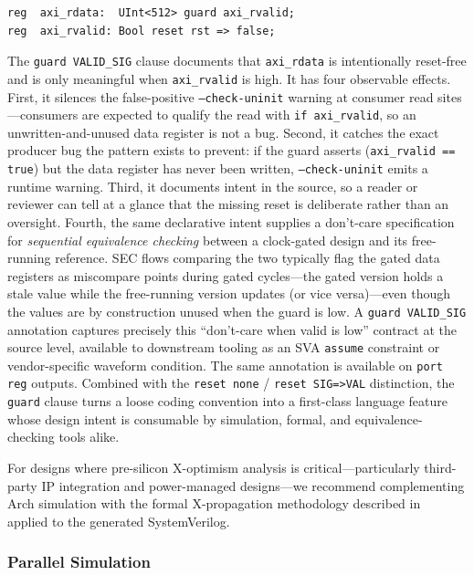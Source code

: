 \documentclass[11pt,twocolumn]{article}
\begin{document}
\begin{lstlisting}[language=Arch]
reg  axi_rdata:  UInt<512> guard axi_rvalid;
reg  axi_rvalid: Bool reset rst => false;
\end{lstlisting}

The \texttt{guard VALID\_SIG} clause documents that \texttt{axi\_rdata} is intentionally reset-free and is only meaningful when \texttt{axi\_rvalid} is high. It has four observable effects. First, it silences the false-positive \texttt{--check-uninit} warning at consumer read sites---consumers are expected to qualify the read with \texttt{if axi\_rvalid}, so an unwritten-and-unused data register is not a bug. Second, it catches the exact producer bug the pattern exists to prevent: if the guard asserts (\texttt{axi\_rvalid == true}) but the data register has never been written, \texttt{--check-uninit} emits a runtime warning. Third, it documents intent in the source, so a reader or reviewer can tell at a glance that the missing reset is deliberate rather than an oversight. Fourth, the same declarative intent supplies a don't-care specification for \emph{sequential equivalence checking} between a clock-gated design and its free-running reference. SEC flows comparing the two typically flag the gated data registers as miscompare points during gated cycles---the gated version holds a stale value while the free-running version updates (or vice versa)---even though the values are by construction unused when the guard is low. A \texttt{guard VALID\_SIG} annotation captures precisely this ``don't-care when valid is low'' contract at the source level, available to downstream tooling as an SVA \texttt{assume} constraint or vendor-specific waveform condition. The same annotation is available on \texttt{port reg} outputs. Combined with the \texttt{reset none} / \texttt{reset SIG=>VAL} distinction, the \texttt{guard} clause turns a loose coding convention into a first-class language feature whose design intent is consumable by simulation, formal, and equivalence-checking tools alike.

For designs where pre-silicon X-optimism analysis is critical---particularly third-party IP integration and power-managed designs---we recommend complementing Arch simulation with the formal X-propagation methodology described in~\cite{zhao2014xoptimism} applied to the generated SystemVerilog.

\subsubsection{Parallel Simulation}
\end{document}
